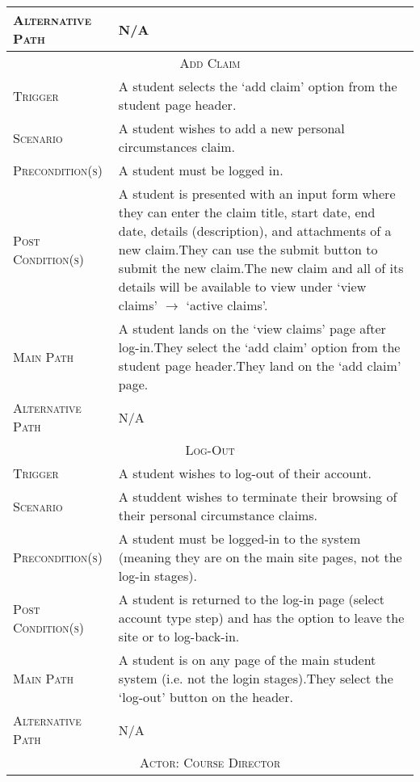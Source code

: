 \documentclass[11pt, english]{article}
\begin{document}
\begin{center}
\begin{longtable}{p{3cm}|p{9cm}}
		\textsc{Alternative Path} & N/A\\
		\hline
		\multicolumn{2}{c}{\textsc{Add Claim}}\\
		\hline
		\textsc{Trigger} & A student selects the `add claim' option from the student page header.\\
		\textsc{Scenario} & A student wishes to add a new personal circumstances claim.\\
		\textsc{Precondition(s)} & A student must be logged in.\\
		\textsc{Post Condition(s)} & A student is presented with an input form where they can enter the claim title, start date, end date, details (description), and attachments of a new claim.\newline They can use the submit button to submit the new claim.\newline The new claim and all of its details will be available to view under `view claims' $\rightarrow$ `active claims'.\\
		\textsc{Main Path} & A student lands on the `view claims' page after log-in.\newline They select the `add claim' option from the student page header.\newline They land on the `add claim' page.\\
		\textsc{Alternative Path} & N/A\\
		\hline
		\multicolumn{2}{c}{\textsc{Log-Out}}\\
		\hline
		\textsc{Trigger} & A student wishes to log-out of their account.\\
		\textsc{Scenario} & A studdent wishes to terminate their browsing of their personal circumstance claims.\\
		\textsc{Precondition(s)} & A student must be logged-in to the system (meaning they are on the main site pages, not the log-in stages).\\
		\textsc{Post Condition(s)} & A student is returned to the log-in page (select account type step) and has the option to leave the site or to log-back-in.\\
		\textsc{Main Path} & A student is on any page of the main student system (i.e. not the login stages).\newline They select the `log-out' button on the header.\\
		\textsc{Alternative Path} & N/A\\
		\hline
		\hline
		\multicolumn{2}{c}{\textsc{Actor: Course Director}}\\
		\hline
		\hline

\end{longtable}
\end{center}
\end{document}
